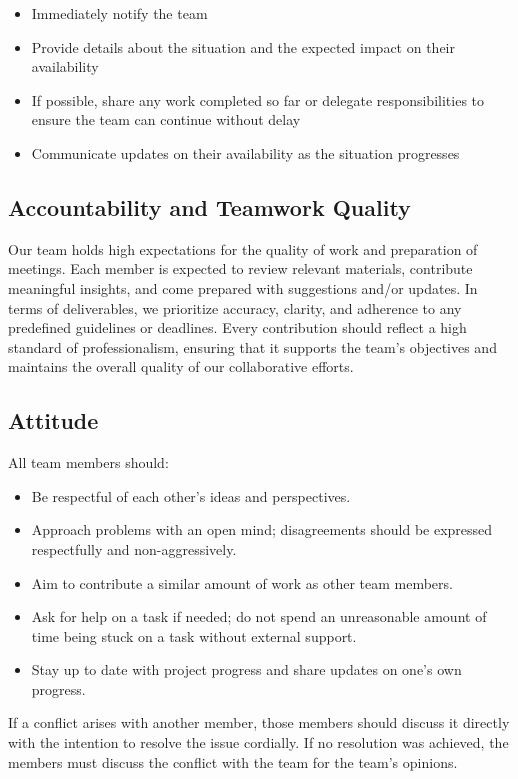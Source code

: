 \documentclass{article}
\begin{document}
\begin{itemize}
    \item Immediately notify the team
    \item Provide details about the situation and the expected impact on their availability
    \item If possible, share any work completed so far or delegate responsibilities to ensure the team can continue without delay
    \item Communicate updates on their availability as the situation progresses
\end{itemize}

\subsection{Accountability and Teamwork Quality}

Our team holds high expectations for the quality of work and preparation of meetings. Each member is expected to review relevant materials, contribute meaningful insights, and come prepared with suggestions and/or updates. In terms of deliverables, we prioritize accuracy, clarity, and adherence to any predefined guidelines or deadlines. Every contribution should reflect a high standard of professionalism, ensuring that it supports the team’s objectives and maintains the overall quality of our collaborative efforts.

\subsection{Attitude}

All team members should:

\begin{itemize}
    \item Be respectful of each other’s ideas and perspectives.
    \item Approach problems with an open mind; disagreements should be expressed respectfully and non-aggressively.
    \item Aim to contribute a similar amount of work as other team members.
    \item Ask for help on a task if needed; do not spend an unreasonable amount of time being stuck on a task without external support.
    \item Stay up to date with project progress and share updates on one’s own progress.
\end{itemize}

If a conflict arises with another member, those members should discuss it directly with the intention to resolve the issue cordially. If no resolution was achieved, the members must discuss the conflict with the team for the team’s opinions.
\end{document}

